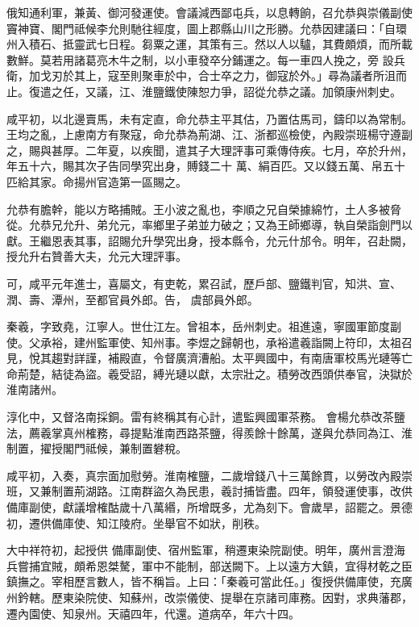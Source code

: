 \begin{pinyinscope}
 俄知通利軍，兼黃、御河發運使。會議減西鄙屯兵，以息轉餉，召允恭與崇儀副使竇神寶、閣門祗候李允則馳往經度，圖上郡縣山川之形勝。允恭因建議曰：「自環州入積石、抵靈武七日程。芻粟之運，其策有三。然以人以驢，其費頗煩，而所載數鮮。莫若用諸葛亮木牛之制，以小車發卒分鋪運之。每一車四人挽之，旁
 設兵衛，加戈刃於其上，寇至則聚車於中，合士卒之力，御寇於外。」尋為議者所沮而止。復遣之任，又議，江、淮鹽鐵使陳恕力爭，詔從允恭之議。加領康州刺史。



 咸平初，以北邊賣馬，未有定直，命允恭主平其估，乃置估馬司，鑄印以為常制。王均之亂，上慮南方有聚寇，命允恭為荊湖、江、浙都巡檢使，內殿崇班楊守遵副之，賜與甚厚。二年夏，以疾聞，遣其子大理評事可乘傳侍疾。七月，卒於升州，年五十六，賜其次子告同學究出身，賻錢二十
 萬、絹百匹。又以錢五萬、帛五十匹給其家。命揚州官造第一區賜之。



 允恭有膽幹，能以方略捕賊。王小波之亂也，李順之兄自榮據綿竹，土人多被脅從。允恭兄允升、弟允元，率鄉里子弟並力破之；又為王師鄉導，執自榮詣劍門以獻。王繼恩表其事，詔賜允升學究出身，授本縣令，允元什邡令。明年，召赴闕，授允升右贊善大夫，允元大理評事。



 可，咸平元年進士，喜屬文，有吏乾，累召試，歷戶部、鹽鐵判官，知洪、宣、潤、壽、潭州，至都官員外郎。告，
 虞部員外郎。



 秦羲，字致堯，江寧人。世仕江左。曾祖本，岳州刺史。祖進遠，寧國軍節度副使。父承裕，建州監軍使、知州事。李煜之歸朝也，承裕遣羲詣闕上符印，太祖召見，悅其趨對詳謹，補殿直，令督廣濟漕船。太平興國中，有南唐軍校馬光璉等亡命荊楚，結徒為盜。羲受詔，縛光璉以獻，太宗壯之。積勞改西頭供奉官，決獄於淮南諸州。



 淳化中，又督洛南採銅。雷有終稱其有心計，遣監興國軍茶務。
 會楊允恭改茶鹽法，薦羲掌真州榷務，尋提點淮南西路茶鹽，得羨餘十餘萬，遂與允恭同為江、淮制置，擢授閣門祗候，兼制置礬稅。



 咸平初，入奏，真宗面加慰勞。淮南榷鹽，二歲增錢八十三萬餘貫，以勞改內殿崇班，又兼制置荊湖路。江南群盜久為民患，羲討捕皆盡。四年，領發運使事，改供備庫副使，獻議增榷酤歲十八萬緡，所增既多，尤為刻下。會歲旱，詔罷之。景德初，遷供備庫使、知江陵府。坐舉官不如狀，削秩。



 大中祥符初，起授供
 備庫副使、宿州監軍，稍遷東染院副使。明年，廣州言澄海兵嘗捕宜賊，頗希恩桀驁，軍中不能制，部送闕下。上以遠方大鎮，宜得材乾之臣鎮撫之。宰相歷言數人，皆不稱旨。上曰：「秦羲可當此任。」復授供備庫使，充廣州鈐轄。歷東染院使、知蘇州，改崇儀使、提舉在京諸司庫務。因對，求典藩郡，遷內園使、知泉州。天禧四年，代還。道病卒，年六十四。




\end{pinyinscope}
